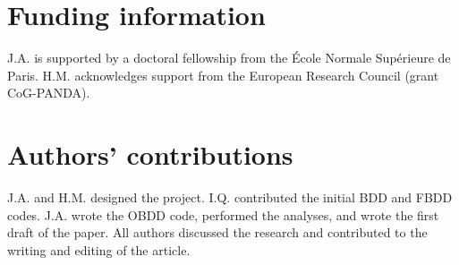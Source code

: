 \documentclass[oupdraft]{sysbio}
\begin{document}
\section{Funding information}

J.A. is supported by a doctoral fellowship from the École Normale Supérieure de Paris. H.M. acknowledges support from the European Research Council (grant CoG-PANDA).

\section{Authors' contributions}

J.A. and H.M. designed the project. I.Q. contributed the initial BDD and FBDD codes. J.A. wrote the OBDD code, performed the analyses, and wrote the first draft of the paper. All authors discussed the research and contributed to the writing and editing of the article.


\clearpage

{
\singlespacing            %
\setlength{\parskip}{0pt}  %

}
\end{document}
